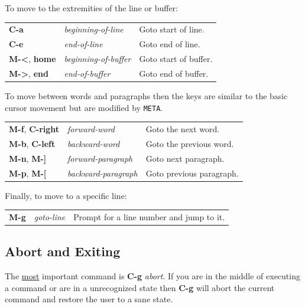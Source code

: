 \documentclass[11pt,a4paper,pdftex]{article}
\begin{document}
  To move to the extremities of the line or buffer:

  \begin{longtable}{ll@{\ --\ }l}
    \endhead
    \endfoot
    \endlastfoot
    \textbf{C-a} & \textit{beginning-of-line} &
    Goto start of line.\\
    \textbf{C-e} & \textit{end-of-line} &
    Goto end of line.\\
    \textbf{M-<}, \textbf{home} & \textit{beginning-of-buffer} &
    Goto start of buffer.\\
    \textbf{M->}, \textbf{end} & \textit{end-of-buffer} &
    Goto end of buffer.\\
  \end{longtable}

  To move between words and paragraphs then the keys are similar to the basic
  cursor movement but are modified by \texttt{META}.

  \begin{longtable}{ll@{\ --\ }l}
    \endhead
    \endfoot
    \endlastfoot
    \textbf{M-f}, \textbf{C-right} & \textit{forward-word} &
    Goto the next word.\\
    \textbf{M-b}, \textbf{C-left} & \textit{backward-word} &
    Goto the previous word.\\
    \textbf{M-n}, \textbf{M-]} & \textit{forward-paragraph} &
    Goto next paragraph.\\
    \textbf{M-p}, \textbf{M-[} & \textit{backward-paragraph} &
    Goto previous paragraph.\\
  \end{longtable}

  Finally, to move to a specific line:

  \begin{longtable}{ll@{\ --\ }l}
    \endhead
    \endfoot
    \endlastfoot
    \textbf{M-g} & \textit{goto-line} &
    Prompt for a line number and jump to it.\\
  \end{longtable}

\subsection{Abort and Exiting}

  The \underline{most} important command is \textbf{C-g} \textit{abort}. If
  you are in the middle of executing a command or are in a unrecognized state
  then \textbf{C-g} will abort the current command and restore the user to a
  sane state.
\end{document}
